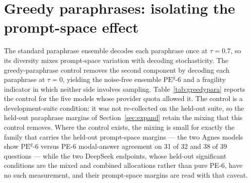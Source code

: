 
\section{Greedy paraphrases: isolating the prompt-space effect}
\setcounter{table}{0}
\label{app:greedypara}
\label{sec:greedypara}

The standard paraphrase ensemble decodes each paraphrase once at $\tau = 0.7$, so its diversity mixes prompt-space variation with decoding stochasticity. The greedy-paraphrase control removes the second component by decoding each paraphrase at $\tau = 0$, yielding the noise-free ensemble $\mathrm{PE}^{g}\text{-}6$ and a fragility indicator in which neither side involves sampling. Table~\ref{tab:greedypara} reports the control for the five models whose provider quota allowed it. The control is a development-suite condition: it was not re-collected on the held-out suite, so the held-out paraphrase margins of Section~\ref{sec:expand} retain the mixing that this control removes. Where the control exists, the mixing is small for exactly the family that carries the held-out prompt-space margins --- the two Agnes models show $\mathrm{PE}^{g}$-6 versus PE-6 modal-answer agreement on 31 of 32 and 38 of 39 questions --- while the two DeepSeek endpoints, whose held-out significant conditions are the mixed and combined allocations rather than pure PE-6, have no such measurement, and their prompt-space margins are read with that caveat.

\begin{table}[htbp]
\centering
\footnotesize
\caption{Greedy-paraphrase control. Accuracy (\%) of the greedy baseline, SC-6, PE-6, and the greedy-decoded paraphrase ensemble PE$^{g}$-6; Frag.$^{g}$ is the fraction of questions where SC-6 and PE$^{g}$-6 disagree (no decoding noise on the paraphrase side); Degen.$^{g}$ is the fraction of questions where all six greedy paraphrase answers coincide.}
\label{tab:greedypara}

\end{table}

